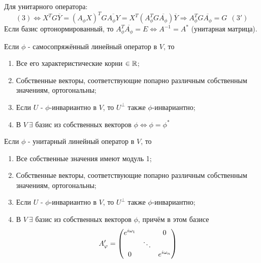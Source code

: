 Для унитарного оператора:
$$(3) \Longleftrightarrow X^TG\overline{Y} = (A_\phi X)^TG\overline{A_\phi Y} = X^T(A_\phi^TG\overline{A_\phi})\overline{Y} \Longrightarrow A_\phi^TG\overline{A_\phi} = G  \ \ (3')$$
Если базис ортонормированный, то $A_\phi^T\overline{A_\phi} = E \Longleftrightarrow A^{-1} = A^*$ (унитарная матрица).

\begin{theorem}
    Если $\phi$ - самосопряжённый линейный оператор в $V$, то
    \begin{enumerate}
        \item Все его характеристические корни $\in \mathbb{R}$;
        \item Собственные векторы, соответствующие попарно различным собственным значениям, ортогональны;
        \item Если $U$ - $\phi$-инвариантно в $V$, то $U^\perp$ также $\phi$-инвариантно;
        \item В $V \ \exists$ базис из собственных векторов $\phi \Longleftrightarrow \phi = \phi^*$   
    \end{enumerate}
\end{theorem}
\begin{theorem}
    Если $\phi$ - унитарный линейный оператор в $V$, то 
    \begin{enumerate}
        \item Все собственные значения имеют модуль 1;
        \item Собственные векторы, соответствующие попарно различным собственным значениям, ортогональны;
        \item Если $U$ - $\phi$-инвариантно в $V$, то $U^\perp$ также $\phi$-инвариантно;
        \item В $V \ \exists$ базис из собственных векторов $\phi$, причём в этом базисе
        $$A'_\phi = \begin{pmatrix}e^{i\omega_1}&\null&0\\\null&\ddots&\null\\0&\null&e^{i\omega_n}\end{pmatrix}$$
    \end{enumerate}
\end{theorem}

